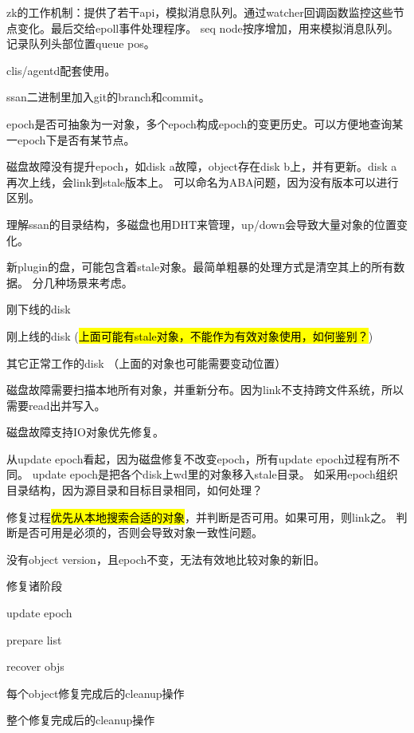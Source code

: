 zk的工作机制：提供了若干api，模拟消息队列。通过watcher回调函数监控这些节点变化。最后交给epoll事件处理程序。
seq node按序增加，用来模拟消息队列。记录队列头部位置queue pos。

clis/agentd配套使用。

ssan二进制里加入git的branch和commit。

epoch是否可抽象为一对象，多个epoch构成epoch的变更历史。可以方便地查询某一epoch下是否有某节点。

\hrulefill

磁盘故障没有提升epoch，如disk a故障，object存在disk b上，并有更新。disk a再次上线，会link到stale版本上。
可以命名为ABA问题，因为没有版本可以进行区别。

理解ssan的目录结构，多磁盘也用DHT来管理，up/down会导致大量对象的位置变化。

新plugin的盘，可能包含着stale对象。最简单粗暴的处理方式是清空其上的所有数据。
分几种场景来考虑。
\begin{enumbox}
\item 刚下线的disk
\item 刚上线的disk (\hl{上面可能有stale对象，不能作为有效对象使用，如何鉴别？})
\item 其它正常工作的disk （上面的对象也可能需要变动位置）
\end{enumbox}

磁盘故障需要扫描本地所有对象，并重新分布。因为link不支持跨文件系统，所以需要read出并写入。

磁盘故障支持IO对象优先修复。

从update epoch看起，因为磁盘修复不改变epoch，所有update epoch过程有所不同。
update epoch是把各个disk上wd里的对象移入stale目录。
如采用epoch组织目录结构，因为源目录和目标目录相同，如何处理？

修复过程\hl{优先从本地搜索合适的对象}，并判断是否可用。如果可用，则link之。
判断是否可用是必须的，否则会导致对象一致性问题。

没有object version，且epoch不变，无法有效地比较对象的新旧。

修复诸阶段
\begin{enumbox}
\item update epoch
\item prepare list
\item recover objs
\item 每个object修复完成后的cleanup操作
\item 整个修复完成后的cleanup操作
\end{enumbox}

\hrulefill

